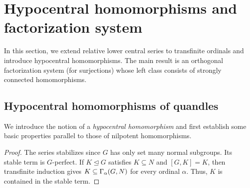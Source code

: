 
\section{Hypocentral homomorphisms and factorization system}
\label{section: hypocentral homomorphisms}

In this section, we extend relative lower central series to transfinite ordinals and introduce hypocentral homomorphisms. The main result is an orthogonal factorization system (for surjections) whose left class consists of strongly connected homomorphisms.

\subsection{Hypocentral homomorphisms of quandles}
\label{subsection: hypocentral homomorphisms of quandles}
We introduce the notion of a \emph{hypocentral homomorphism} and first establish some basic properties parallel to those of nilpotent homomorphisms.



\begin{proof}
The series stabilizes since $G$ has only set many normal subgroups. Its stable term is $G$-perfect. If $K\trianglelefteq G$ satisfies $K\subseteq N$ and $[G,K]=K$, then transfinite induction gives $K\subseteq\Gamma_\alpha(G,N)$ for every ordinal $\alpha$. Thus, $K$ is contained in the stable term.
\end{proof}

